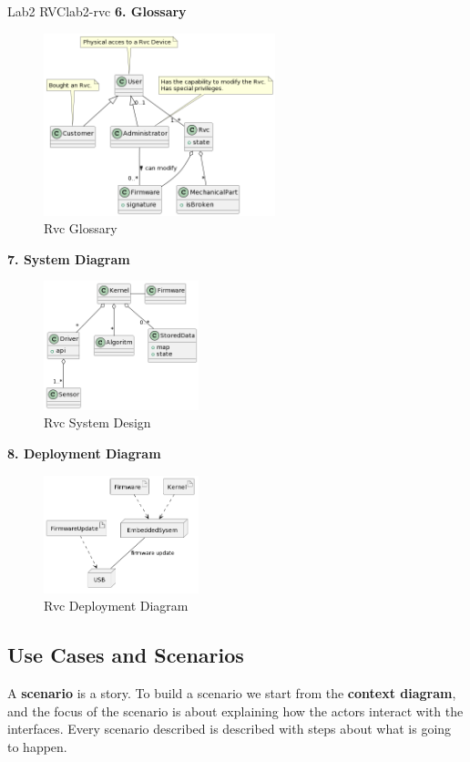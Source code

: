 \documentclass[12pt]{article}
\begin{document}
\hfill

\begin{example}{Lab2 RVC}{lab2-rvc}
  \textbf{6. Glossary}
  \begin{figure}[H]
    \centering
    \includegraphics[width=0.6\textwidth]{rvc-glossary.png}
    \caption{Rvc Glossary}
    \label{fig:rvc-glossary}
  \end{figure}
  \textbf{7. System Diagram}
  \begin{figure}[H]
    \centering
    \includegraphics[width=0.4\textwidth]{rvc-system-design.png}
    \caption{Rvc System Design}
    \label{fig:rvc-system-design}
  \end{figure}
  \textbf{8. Deployment Diagram}
  \begin{figure}[H]
    \centering
    \includegraphics[width=0.4\textwidth]{rvc-deployment-diagram.png}
    \caption{Rvc Deployment Diagram}
    \label{fig:rvc-deployment-diagram}
  \end{figure}
\end{example}


\subsection{Use Cases and Scenarios}
A \textbf{scenario} is a story. To build a scenario we start from the \textbf{context diagram}, and the focus of the scenario is about explaining how the actors interact with the interfaces. Every scenario described is described with steps about what is going to happen.
\end{document}
